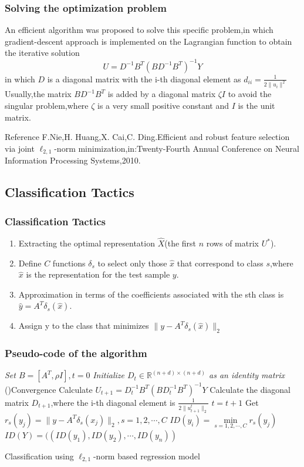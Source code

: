 \documentclass{beamer}
\begin{document}
\begin{frame}\frametitle{Solving the optimization problem}
An efficient algorithm was proposed to solve this specific problem,in which gradient-descent approach is implemented on the Lagrangian function to obtain the iterative solution
\begin{equation}\label{eq:opt}
U=D^{-1}B^T(BD^{-1}B^T)^{-1}Y
\end{equation}
in which $D$ is a diagonal matrix with the i-th diagonal element as $d_{ii}=\frac{1}{2\|u_i\|^2}$\\
Usually,the matrix $BD^{-1}B^T$ is added by a diagonal matrix $\zeta I$ to avoid the singular problem,where $\zeta$ is a very small positive constant and $I$ is the unit matrix.
\begin{block}{Reference}
F.Nie,H. Huang,X. Cai,C. Ding.Efficient and robust feature selection via joint $\ell_{2,1}$-norm minimization,in:Twenty-Fourth Annual Conference on Neural Information Processing Systems,2010.
\end{block}
\end{frame}


\subsection{Classification Tactics}
\begin{frame}\frametitle{Classification Tactics}
\begin{enumerate}
\item Extracting the optimal representation $\hat{X}$(the first $n$ rows of matrix $U^*$).
\item Define $C$ functions $\delta_s$ to select only those $\hat{x}$ that correspond to class $s$,where $\hat{x}$ is the representation for the test sample $y$.
\item Approximation in terms of the coefficients associated with the sth class is $\hat{y}=A^T\delta_s(\hat{x})$.
\item Assign y to the class that minimizes $\|y-A^T\delta_s(\hat{x})\|_2$
\end{enumerate}
\end{frame}

\begin{frame}\frametitle{Pseudo-code of the algorithm}
\begin{algorithm}[H]
\emph{Set $B=\left[ A^T,\rho I \right],t=0$}\;
\emph{Initialize $D_t \in \mathbb R^{(n+d) \times (n+d)}$ as an identity matrix}\;
\Repeat(){Convergence}
{
	Calculate $U_{t+1}=D_t^{-1}B^T(BD_t^{-1}B^T)^{-1}Y$\;
	Calculate the diagonal matrix $D_{t+1}$,where the i-th diagonal element is $\frac{1}{2\|u_{t+1}^t\|_2}$\;
	$t=t+1$\;
}
{
	Get $r_s(y_j)=\|y-A^T\delta_s(x_j)\|_2,s=1,2,\cdots ,C$\;
	$ID(y_i)=\mathop{\min}\limits_{s=1,2,\cdots ,C}r_s(y_j)$\;
}
\Return $ID(Y)=((ID(y_1),ID(y_2),\cdots ,ID(y_n))$\;	
\caption{Classification using $\ell_{2,1}$-norm based regression model}
\end{algorithm}
\end{frame}
\end{document}

